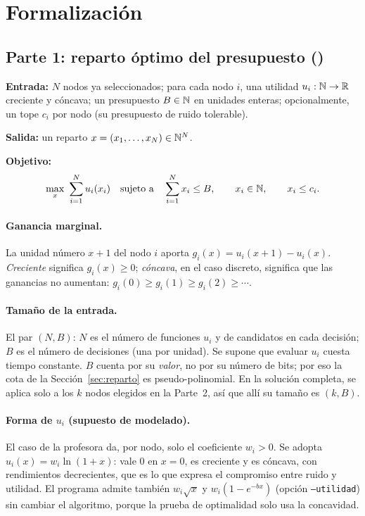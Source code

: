 \section{Formalización}\label{sec:formalizacion}

\subsection{Parte 1: reparto óptimo del presupuesto (\REP)}

\begin{definicion}
\textbf{Entrada:} $N$ nodos ya seleccionados; para cada nodo $i$, una utilidad $u_i:\mathbb{N}\to\mathbb{R}$
creciente y cóncava; un presupuesto $B\in\mathbb{N}$ en unidades enteras; opcionalmente, un tope $c_i$ por
nodo (su presupuesto de ruido tolerable).

\textbf{Salida:} un reparto $x=(x_1,\dots,x_N)\in\mathbb{N}^N$.

\textbf{Objetivo:}
\[
  \max_{x}\ \sum_{i=1}^{N} u_i(x_i)
  \quad\text{sujeto a}\quad \sum_{i=1}^{N} x_i \le B,\qquad x_i\in\N,\qquad x_i\le c_i .
\]
\end{definicion}

\paragraph{Ganancia marginal.} La unidad número $x+1$ del nodo $i$ aporta
$g_i(x)=u_i(x+1)-u_i(x)$. \emph{Creciente} significa $g_i(x)\ge 0$; \emph{cóncava}, en el caso
discreto, significa que las ganancias no aumentan: $g_i(0)\ge g_i(1)\ge g_i(2)\ge\cdots$.

\paragraph{Tamaño de la entrada.} El par $(N,B)$: $N$ es el número de funciones $u_i$ y de
candidatos en cada decisión; $B$ es el número de decisiones (una por unidad). Se supone que evaluar
$u_i$ cuesta tiempo constante. $B$ cuenta por su \emph{valor}, no por su número de bits; por eso
la cota de la Sección~\ref{sec:reparto} es pseudo-polinomial. En la solución completa, \REP{} se
aplica solo a los $k$ nodos elegidos en la Parte~2, así que allí su tamaño es $(k,B)$.

\paragraph{Forma de $u_i$ (supuesto de modelado).} El caso de la profesora da, por nodo, solo el
coeficiente $w_i>0$. Se adopta $u_i(x)=w_i\ln(1+x)$: vale $0$ en $x=0$, es creciente y es cóncava,
con rendimientos decrecientes, que es lo que expresa el compromiso entre ruido y utilidad. El
programa admite también $w_i\sqrt{x}$ y $w_i(1-e^{-bx})$ (opción \texttt{--utilidad}) sin cambiar
el algoritmo, porque la prueba de optimalidad solo usa la concavidad.

